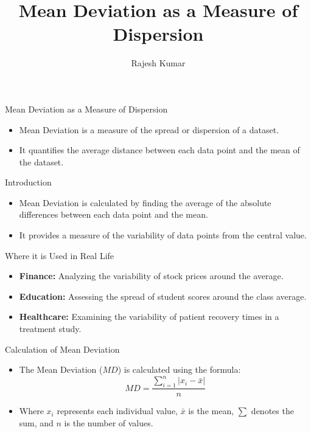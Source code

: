 
\title{Mean Deviation as a Measure of Dispersion}
\author{Rajesh Kumar}
\date{}

\begin{frame}
  \titlepage
\end{frame}

\begin{frame}{Mean Deviation as a Measure of Dispersion}
  \begin{itemize}
    \item Mean Deviation is a measure of the spread or dispersion of a dataset.
    \item It quantifies the average distance between each data point and the mean of the dataset.
  \end{itemize}
\end{frame}

\begin{frame}{Introduction}
  \begin{itemize}
    \item Mean Deviation is calculated by finding the average of the absolute differences between each data point and the mean.
    \item It provides a measure of the variability of data points from the central value.
  \end{itemize}
\end{frame}

\begin{frame}{Where it is Used in Real Life}
  \begin{itemize}
    \item \textbf{Finance:} Analyzing the variability of stock prices around the average.
    \item \textbf{Education:} Assessing the spread of student scores around the class average.
    \item \textbf{Healthcare:} Examining the variability of patient recovery times in a treatment study.
  \end{itemize}
\end{frame}

\begin{frame}{Calculation of Mean Deviation}
  \begin{itemize}
    \item The Mean Deviation (\(MD\)) is calculated using the formula:
    \[ MD = \frac{\sum_{i=1}^{n} |x_i - \bar{x}|}{n} \]
    \item Where \(x_i\) represents each individual value, \(\bar{x}\) is the mean, \(\sum\) denotes the sum, and \(n\) is the number of values.
  \end{itemize}
\end{frame}

